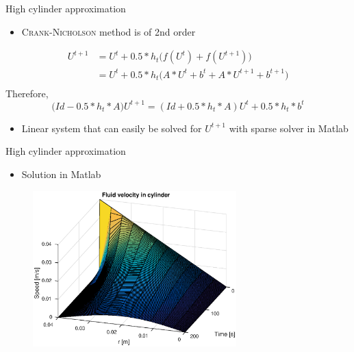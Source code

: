 \documentclass{beamer}
\begin{document}
\begin{frame}{High cylinder approximation}
\begin{itemize}
\item \textsc{Crank-Nicholson} method is of 2nd order
\end{itemize}
\begin{align*}
U^{t+1} &= U^{t} + 0.5*h_{t}\Big(f(U^{t}) + f(U^{t+1})\Big)\\
  &= U^{t} + 0.5*h_{t}\Big(A*U^{t}+b^t + A*U^{t+1} + b^{t+1}\Big)\\
\end{align*}
Therefore,
$$\Big(Id -0.5*h_{t}*A\big)U^{t+1} = (Id + 0.5*h_{t}*A)U^{t}+0.5*h_{t}*b^t$$
\begin{itemize}
\item Linear system that can easily be solved for $U^{t+1}$ with sparse solver in Matlab
\end{itemize}
\end{frame}

\begin{frame}{High cylinder approximation}
\begin{itemize}
\item Solution in Matlab
\end{itemize}
\begin{figure}[!h]
\centering
\includegraphics[width = 0.7\textwidth]{./dim1.eps}
\end{figure}
\end{frame}
\end{document}
